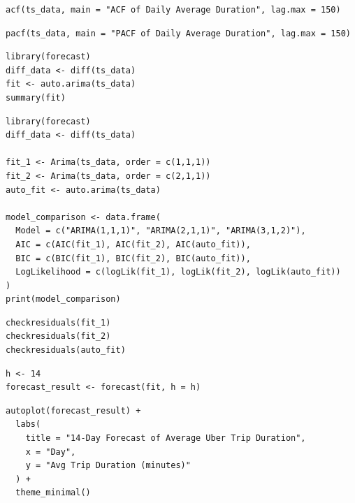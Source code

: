 \documentclass{article}
\begin{document}
\begin{lstlisting}[style=rstyle, caption={ ACF Plot}, label={lst:r_acf}]
acf(ts_data, main = "ACF of Daily Average Duration", lag.max = 150)
\end{lstlisting}

\begin{lstlisting}[style=rstyle, caption={ PACF Plot}, label={lst:r_pacf}]
pacf(ts_data, main = "PACF of Daily Average Duration", lag.max = 150)
\end{lstlisting}

\begin{lstlisting}[style=rstyle, caption={ ARIMA Model}, label={lst:r_arima}]
library(forecast)
diff_data <- diff(ts_data)
fit <- auto.arima(ts_data)
summary(fit)
\end{lstlisting}

\begin{lstlisting}[style=rstyle, caption={ Model Selection and Diagnostics}, label={lst:r_arima_model}]
library(forecast)
diff_data <- diff(ts_data)

fit_1 <- Arima(ts_data, order = c(1,1,1))
fit_2 <- Arima(ts_data, order = c(2,1,1))
auto_fit <- auto.arima(ts_data)

model_comparison <- data.frame(
  Model = c("ARIMA(1,1,1)", "ARIMA(2,1,1)", "ARIMA(3,1,2)"),
  AIC = c(AIC(fit_1), AIC(fit_2), AIC(auto_fit)),
  BIC = c(BIC(fit_1), BIC(fit_2), BIC(auto_fit)),
  LogLikelihood = c(logLik(fit_1), logLik(fit_2), logLik(auto_fit))
)
print(model_comparison)
\end{lstlisting}

\begin{lstlisting}[style=rstyle, caption={ Model Selection and Diagnostics}, label={lst:r_arima_resid}]
checkresiduals(fit_1)
checkresiduals(fit_2)
checkresiduals(auto_fit)
\end{lstlisting}

\begin{lstlisting}[style=rstyle, caption={ 14-day Forecast}, label={lst:r_forecast}]
h <- 14
forecast_result <- forecast(fit, h = h)
\end{lstlisting}

\begin{lstlisting}[style=rstyle, caption={ Plot of 14-day Forecast}, label={lst:r_forecast_plot}]
autoplot(forecast_result) +
  labs(
    title = "14-Day Forecast of Average Uber Trip Duration",
    x = "Day",
    y = "Avg Trip Duration (minutes)"
  ) +
  theme_minimal()
\end{lstlisting}
\end{document}
